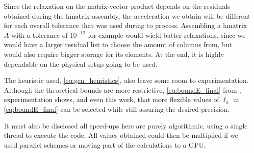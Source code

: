 Since the relaxation on the matrix-vector product depends on the residuals obtained during the \acrshort{hmatrix} assembly, the acceleration we obtain will be different for each overall tolerance that was used during to process. Assembling a \acrshort{hmatrix} $A$ with a tolerance of $10^{-12}$ for example would wield batter relaxations, since we would have a larger residual list to choose the amount of columns from, but would also require bigger storage for its elements. At the end, it is highly dependable on the physical setup going to be used.

The heuristic used, \ref{eq:gen_heuristics}, also leave some room to experimentation. Although the theoretical bounds are more restrictive, \ref{eq:boundE_final} from \cite{simoncini2003theory}, experimentation shows, \cite{wang2016inexactkryloviterationsrelaxation} and even this work, that more flexible values of $\ell_{k}$ in \autoref{eq:boundE_final} can be selected while still assuring the desired precision.

It must also be disclosed all speed-ups here are purely algorithmic, using a single thread to execute the code. All values obtained could then be multiplied if we used parallel schemes or moving part of the calculations to a GPU. 

